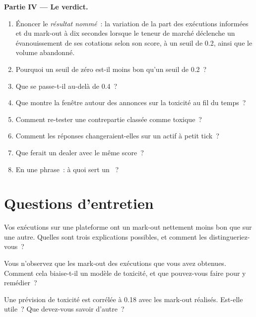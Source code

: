 \begin{problem}
\medskip\noindent\textbf{Partie IV --- Le verdict.}
\begin{enumerate}[resume]
\item Énoncer le \emph{résultat nommé}~: la variation de la part des exécutions informées et du mark-out à dix secondes lorsque le teneur de marché déclenche un évanouissement de ses cotations selon son score, à
un seuil de 0.2, ainsi que le volume abandonné.
\item Pourquoi un seuil de zéro est-il moins bon qu'un seuil de 0.2~?
\item Que se passe-t-il au-delà de 0.4~?
\item Que montre la fenêtre autour des annonces sur la toxicité au fil du temps~?
\item Comment re-tester une contrepartie classée comme toxique~?
\item Comment les réponses changeraient-elles sur un actif à petit tick~?
\item Que ferait un dealer avec le même score~?
\item En une phrase~: à quoi sert un ~?
\end{enumerate}
\end{problem}

\section{Questions d'entretien}

\begin{interviewq}\label{iq:hf:adverse-selection-and-toxicity:1}
Vos exécutions sur une plateforme ont un mark-out nettement moins bon que sur une autre. Quelles sont trois explications possibles, et comment les distingueriez-vous~?
\end{interviewq}

\begin{interviewq}\label{iq:hf:adverse-selection-and-toxicity:2}
Vous n'observez que les mark-out des exécutions que vous avez obtenues. Comment cela biaise-t-il un modèle de toxicité, et que pouvez-vous faire pour y remédier~?
\end{interviewq}

\begin{interviewq}\label{iq:hf:adverse-selection-and-toxicity:3}
Une prévision de toxicité est corrélée à 0.18 avec les mark-out réalisés. Est-elle utile~? Que devez-vous savoir d'autre~?
\end{interviewq}

